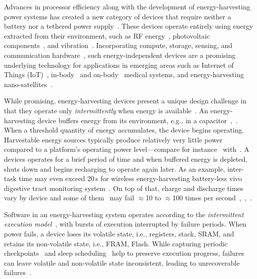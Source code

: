 Advances in processor efficiency along with the development of energy-harvesting power systems has created a new category of devices that require neither a battery nor a tethered power supply~\cite{prasad_comst_2014,lucia_snapl_2017,soyata_csm_2016}. These devices operate entirely using energy extracted from their environment, such as RF energy~\cite{rf_powered_computing_gollakota_2014}, photovoltaic components~\cite{margolies_infocom_2016,margolies_tosn_2016}, and vibration~\cite{gorlatova_sigmetrics_2014}. Incorporating compute, storage, sensing, and communication hardware~\cite{wisp5,moo}, such energy-independent devices are a promising underlying technology for applications in emerging areas such as Internet of Things (IoT)~\cite{ku_cst_2016}, in-body~\cite{nadeau_naturebio_2017} and on-body~\cite{bandodkar_electroanalysis_2015} medical systems, and energy-harvesting nano-satellites~\cite{kicksat}.

While promising, energy-harvesting devices present a unique design challenge in
that they operate only {\em intermittently} when energy is available~\cite{hicks_isca_2017,lucia_snapl_2017}. An
energy-harvesting device buffers energy from its environment, e.g., in a
capacitor~\cite[Fig. 3]{gorlatova_tmc_2013},~\cite[Fig. 1]{gunduz_commag_2014}. When a threshold quantity of energy accumulates, the device begins operating. Harvestable energy sources typically produce relatively very little power compared to a platform's operating power level---compare for instance~\cite[Table III and V]{prasad_comst_2014} with~\cite[Table I]{carrano_cst_2014}. A devices operates for a brief period of time and when buffered energy is depleted, shuts down and begins recharging to operate again later. As an example, inter-task time may even exceed 20\,s for wireless energy-harvesting battery-less vivo digestive tract monitoring system~\cite[Fig. 3c]{nadeau_naturebio_2017}. On top of that, charge and discharge times vary by device and some of them~\cite{wisp} may fail $\approx$10 to $\approx$100 times per second~\cite[Fig. 1]{tan_infocom_2016},~\cite[Fig. 1]{mementos},~\cite[Fig. 3]{nvp}.

Software in an energy-harvesting system operates according to the {\em
intermittent execution model}~\cite{dino,lucia_snapl_2017}, with bursts of
execution interrupted by failure periods.  When power fails, a device loses its
volatile state, i.e., registers, stack, SRAM, and retains its non-volatile
state, i.e., FRAM, Flash. While capturing periodic
checkpoints~\cite{mementos,quickrecall} and sleep
scheduling~\cite{dewdrop,hibernus,hibernusplusplus} help to preserve execution
progress, failures can leave volatile and non-volatile state inconsistent,
leading to unrecoverable failures~\cite{mspcdino,edb}. 

